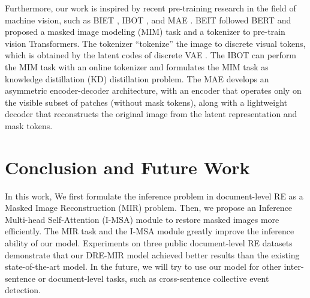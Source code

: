 \documentclass{article}
\begin{document}
\begin{table*}[th]
Furthermore, our work is inspired by recent pre-training research in the field of machine vision, such as BIET \cite{c:23}, IBOT \cite{c:24}, and MAE \cite{c:25}.
BEIT followed BERT \cite{c:29} and proposed a masked image modeling (MIM) task and a tokenizer to pre-train vision Transformers.
The tokenizer “tokenize” the image to discrete visual tokens, which is obtained by the latent codes of discrete VAE \cite{c:55}.
The IBOT can perform the MIM task with an online tokenizer and formulates the MIM task as knowledge distillation (KD) distillation problem.
The MAE develops an asymmetric encoder-decoder architecture, with an encoder that operates only on the visible subset of patches (without mask tokens), along with a lightweight decoder that reconstructs the original image from the latent representation and mask tokens. 


\section{Conclusion and Future Work}
In this work, We first formulate the inference problem in document-level RE as a Masked Image Reconstruction (MIR) problem. 
Then, we propose an Inference Multi-head Self-Attention (I-MSA) module to restore masked images more efficiently.
The MIR task and the I-MSA module greatly improve the inference ability of our model.
Experiments on three public document-level RE datasets demonstrate that our DRE-MIR model achieved better results than the existing state-of-the-art model.
In the future, we will try to use our model for other inter-sentence or document-level tasks, such as cross-sentence collective event detection.









\clearpage
\appendix
\begin{table}[htb]
\centering
{}
\end{table}
\end{table*}
\end{document}
